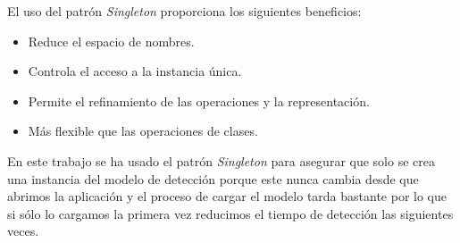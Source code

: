 El uso del patrón \textit{Singleton} proporciona los siguientes beneficios:
\begin{itemize}
    \item Reduce el espacio de nombres.
    \item Controla el acceso a la instancia única.
    \item Permite el refinamiento de las operaciones y la representación.
    \item Más flexible que las operaciones de clases.
\end{itemize}

En este trabajo se ha usado el patrón \textit{Singleton} para asegurar que solo se crea una instancia del modelo de detección porque este nunca cambia desde que abrimos la aplicación y el proceso de cargar el modelo tarda bastante por lo que si sólo lo cargamos la primera vez reducimos el tiempo de detección las siguientes veces.